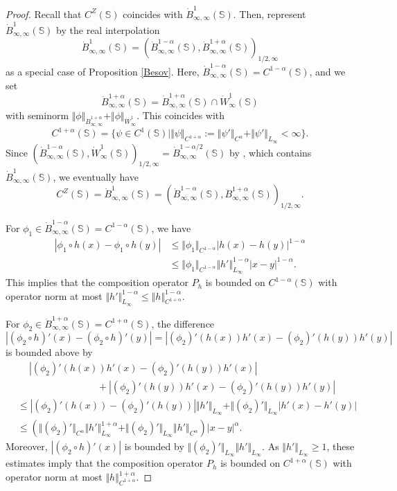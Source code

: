 \documentclass[amstex]{amsart}
\theoremstyle{definition}
\theoremstyle{remark}
\numberwithin{equation}{section}
\begin{document}
\begin{proof}
Recall that $C^Z(\mathbb S)$ coincides with $\dot B^1_{\infty,\infty}(\mathbb S)$.
Then, represent $\dot B^1_{\infty,\infty}(\mathbb S)$ by the real interpolation
$$
\dot B^1_{\infty,\infty}(\mathbb S)=(\dot B^{1-\alpha}_{\infty,\infty}(\mathbb S),\dot B^{1+\alpha}_{\infty,\infty}(\mathbb S))_{1/2,\infty}
$$
as a special case of Proposition \ref{Besov}.
Here, $\dot B^{1-\alpha}_{\infty,\infty}(\mathbb S)=C^{1-\alpha}(\mathbb S)$, and we set 
$$
\ddot B^{1+\alpha}_{\infty,\infty}(\mathbb S)=\dot B^{1+\alpha}_{\infty,\infty}(\mathbb S) \cap \dot W^1_\infty(\mathbb S)
$$
with seminorm $\Vert \phi \Vert_{\dot B^{1+\alpha}_{\infty,\infty}}+\Vert \phi \Vert_{\dot W^1_\infty}$. This coincides with
$$
C^{1+\alpha}(\mathbb S)=\{\psi \in C^1(\mathbb S) \mid \Vert \psi \Vert_{C^{1+\alpha}}:=
\Vert \psi' \Vert_{C^{\alpha}}+\Vert \psi' \Vert_{L_\infty}<\infty\}.
$$ 
Since $(\dot B^{1-\alpha}_{\infty,\infty}(\mathbb S),\dot W^1_\infty(\mathbb S))_{1/2,\infty}=
\dot B^{1-\alpha/2}_{\infty,\infty}(\mathbb S)$ by \cite[Theorem 17.30]{Leo},
which contains $\dot B^1_{\infty,\infty}(\mathbb S)$, we eventually have
\begin{equation}\label{represent}
C^Z(\mathbb S)=\dot B^1_{\infty,\infty}(\mathbb S)=(\dot B^{1-\alpha}_{\infty,\infty}(\mathbb S),\ddot B^{1+\alpha}_{\infty,\infty}(\mathbb S))_{1/2,\infty}.
\end{equation}

For $\phi_1 \in \dot B^{1-\alpha}_{\infty,\infty}(\mathbb S)=C^{1-\alpha}(\mathbb S)$,
we have
\begin{align}
|\phi_1 \circ h(x)-\phi_1 \circ h(y)| &\leq \Vert \phi_1 \Vert_{C^{1-\alpha}}|h(x)-h(y)|^{1-\alpha}\\
&\leq \Vert \phi_1 \Vert_{C^{1-\alpha}}\Vert h' \Vert_{L_\infty}^{1-\alpha}|x-y|^{1-\alpha}.
\end{align}
This implies that the composition operator $P_h$ is bounded on $C^{1-\alpha}(\mathbb S)$ with operator norm at most $\Vert h' \Vert_{L_\infty}^{1-\alpha} \leq \Vert h \Vert_{C^{1+\alpha}}^{1-\alpha}$.

For $\phi_2 \in \ddot B^{1+\alpha}_{\infty,\infty}(\mathbb S)=C^{1+\alpha}(\mathbb S)$,
the difference 
$$
|(\phi_2 \circ h)'(x)-(\phi_2 \circ h)'(y)|=|(\phi_2)' (h(x))h'(x)-(\phi_2)' (h(y))h'(y)|
$$
is bounded above by
\begin{align}
&\quad \ |(\phi_2)' (h(x))h'(x)-(\phi_2)' (h(y))h'(x)|\\
&\qquad \qquad \qquad \qquad \ +|(\phi_2)' (h(y))h'(x)-(\phi_2)' (h(y))h'(y)|\\
&\leq |(\phi_2)' (h(x))-(\phi_2)' (h(y))|\Vert h' \Vert_{L_\infty}+\Vert (\phi_2)' \Vert_{L_\infty}|h'(x)-h'(y)|\\
&\leq (\Vert (\phi_2)'\Vert_{C^\alpha} \Vert h' \Vert_{L_\infty}^{1+\alpha}+\Vert (\phi_2)' \Vert_{L_\infty}
\Vert h' \Vert_{C^\alpha})|x-y|^\alpha.
\end{align}
Moreover, $|(\phi_2 \circ h)'(x)|$ is bounded by $\Vert (\phi_2)' \Vert_{L_\infty} \Vert h' \Vert_{L_\infty}$.
As $\Vert h' \Vert_{L_\infty} \geq 1$,
these estimates imply that the composition operator $P_h$ is bounded on $C^{1+\alpha}(\mathbb S)$ 
with operator norm at most $\Vert h \Vert_{C^{1+\alpha}}^{1+\alpha}$.


\end{proof}
\end{document}
